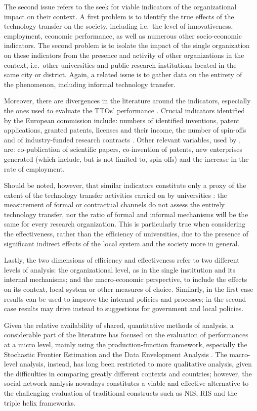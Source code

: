 The second issue refers to the seek for viable indicators of the organizational impact on their context. A first problem is to identify the true effects of the technology transfer on the society, including i.e.\ the level of innovativeness, employment, economic performance, as well as numerous other socio-economic indicators. The second problem is to isolate the impact of the single organization on these indicators from the presence and activity of other organizations in the context, i.e.\ other universities and public research institutions located in the same city or district. Again, a related issue is to gather data on the entirety of the phenomenon, including informal technology transfer. 

Moreover, there are divergences in the literature around the indicators, especially the ones used to evaluate the TTOs' performance \citep{Muscio2010}. Crucial indicators identified by the European commission include: numbers of identified inventions, patent applications, granted patents, licenses and their income, the number of spin-offs and of industry-funded research contracts \citep{Balderi2010}. Other relevant variables, used by \citet{Guerrero2014}, are: co-publication of scientific papers, co-invention of patents, new enterprises generated (which include, but is not limited to, spin-offs) and the increase in the rate of employment. 

Should be noted, however, that similar indicators constitute only a proxy of the extent of the technology transfer activities carried on by universities \citep{Leydesdorff2010}: the measurement of formal or contractual channels do not assess the entirely technology transfer, nor the ratio of formal and informal mechanisms will be the same for every research organization. This is particularly true when considering the effectiveness, rather than the efficiency of universities, due to the presence of significant indirect effects of the local system and the society more in general.

Lastly, the two dimensions of efficiency and effectiveness refer to two different levels of analysis: the organizational level, as in the single institution and its internal mechanisms; and the macro-economic perspective, to include the effects on its context, local system or other measures of choice. Similarly, in the first case results can be used to improve the internal policies and processes; in the second case results may drive instead to suggestions for government and local policies.

Given the relative availability of shared, quantitative methods of analysis, a considerable part of the literature has focused on the evaluation of performances at a micro level, mainly using the production-function framework, especially the Stochastic Frontier Estimation and the Data Envelopment Analysis \citep{Siegel2007}. The macro-level analysis, instead, has long been restricted to more qualitative analysis, given the difficulties in comparing greatly different contexts and countries; however, the social network analysis nowadays constitutes a viable and effective alternative to the challenging evaluation of traditional constructs such as NIS, RIS and the triple helix frameworks.

